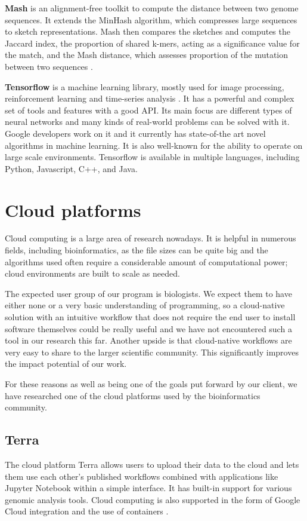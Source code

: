\documentclass{report}
\begin{document}
\textbf{Mash} is an alignment-free toolkit to compute the distance between two genome sequences. It extends the MinHash algorithm, which compresses large sequences to sketch representations. Mash then compares the sketches and computes the Jaccard index, the proportion of shared k-mers, acting as a significance value for the match, and the Mash distance, which assesses proportion of the mutation between two sequences \cite{Mash}.

\textbf{Tensorflow} is a machine learning library, mostly used for image processing, reinforcement learning and time-series analysis \cite{tensorflow_article}. It has a powerful and complex set of tools and features with a good API. Its main focus are different types of neural networks and many kinds of real-world problems can be solved with it. Google developers work on it and it currently has state-of-the art novel algorithms in machine learning. It is also well-known for the ability to operate on large scale environments. Tensorflow is available in multiple languages, including Python, Javascript, C++, and Java.


\section{Cloud platforms}
Cloud computing is a large area of research nowadays. It is helpful in numerous fields, including bioinformatics, as the file sizes can be quite big and the algorithms used often require a considerable amount of computational power; cloud environments are built to scale as needed.

The expected user group of our program is biologists. We expect them to have either none or a very basic understanding of programming, so a cloud-native solution with an intuitive workflow that does not require the end user to install software themselves could be really useful and we have not encountered such a tool in our research this far. Another upside is that cloud-native workflows are very easy to share to the larger scientific community. This significantly improves the impact potential of our work.

For these reasons as well as being one of the goals put forward by our client, we have researched one of the cloud platforms used by the bioinformatics community.


\subsection{Terra}
The cloud platform Terra allows users to upload their data to the cloud and lets them use each other's published workflows combined with applications like Jupyter Notebook within a simple interface. It has built-in support for various genomic analysis tools. Cloud computing is also supported in the form of Google Cloud integration and the use of containers \cite{terra.bio, broad-institute}.
\end{document}

